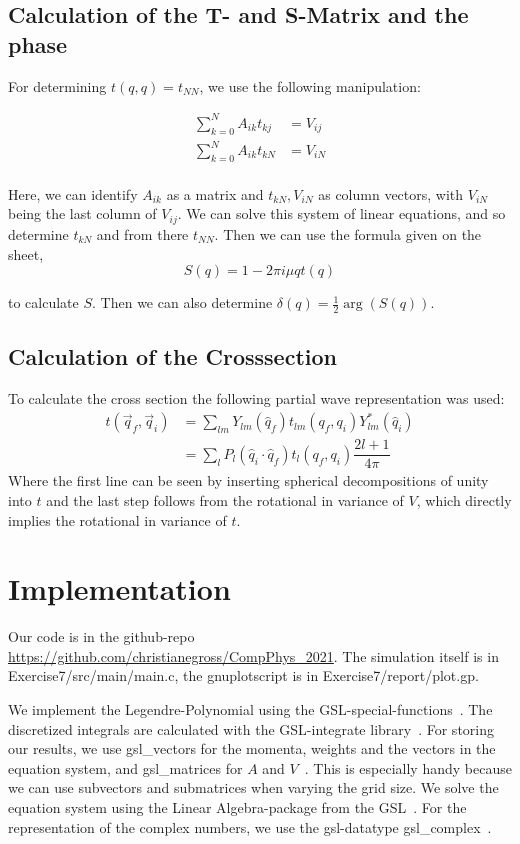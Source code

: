 \documentclass{scrartcl}
\begin{document}
\subsection{Calculation of the T- and S-Matrix and the phase}
	
	For determining $t(q, q)=t_{NN}$, we use the following manipulation:

\begin{align*}
\sum_{k=0}^{N}A_{ik}t_{kj}&=V_{ij}\\
\sum_{k=0}^{N}A_{ik}t_{kN}&=V_{iN}\\
\end{align*}

Here, we can identify $A_{ik}$ as a matrix and $t_{kN}, V_{iN}$ as column vectors, with $V_{iN}$ being the last column of $V_{ij}$. We can solve this system of linear equations, and so determine $t_{kN}$ and from there $t_{NN}$. Then we can use the formula given on the sheet,\[
S(q)=1-2\pi i \mu q t(q)
\]

to calculate $S$. Then we can also determine $\delta(q)=\frac{1}{2}\arg(S(q))$.
	
\subsection{Calculation of the Crosssection}
To calculate the cross section the following partial wave representation was used: 
\begin{align*}
	t(\vec{q}_f,\vec{q}_i)&=\sum\limits_{lm} Y_{lm}(\hat{q}_f)t_{lm}(q_f,q_i)Y_{lm}^*(\hat{q}_i)\\
	&=\sum\limits_{l} P_{l}(\hat{q}_i\cdot\hat{q}_f)t_{l}(q_f,q_i)\dfrac{2l+1}{4\pi}
\end{align*}
Where the first line can be seen by inserting spherical decompositions of unity into $t$ and the last step follows from the rotational in variance of $V$, which directly implies the rotational in variance of $t$.
\section{Implementation}

Our code is in the github-repo \url{https://github.com/christianegross/CompPhys\_2021}. The simulation itself is in Exercise7/src/main/main.c, the gnuplotscript is in Exercise7/report/plot.gp. 

We implement the Legendre-Polynomial using the GSL-special-functions~\cite{gsldoc_sf}. The discretized integrals are calculated with the GSL-integrate library~\cite{gsldoc_integrate}. For storing our results, we use gsl\_vectors for the momenta, weights and the vectors in the equation system, and gsl\_matrices for $A$ and $V$~\cite{gsldoc_mat}. This is especially handy because we can use subvectors and submatrices when varying the grid size. We solve the equation system using the Linear Algebra-package from the GSL~\cite{gsldoc_linalg}. For the representation of the complex numbers, we use the gsl-datatype gsl\_complex~\cite{gsldoc_complex}.
\end{document}
